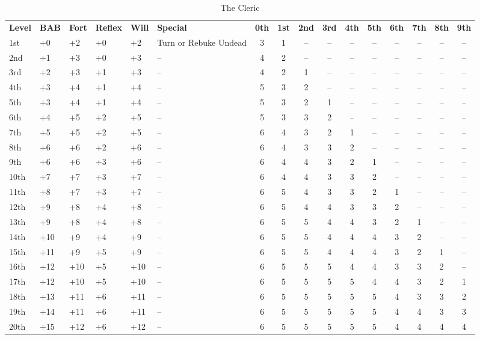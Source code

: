 \begin{table}[htb]
\caption{The Cleric}
\centering
\begin{tabular}{*{5}{l}p{1.5cm}*{10}{c}}
\textbf{Level} & \textbf{BAB} & \textbf{Fort} & \textbf{Reflex} & \textbf{Will} & \textbf{Special} & \textbf{0th} & \textbf{1st} & \textbf{2nd} & \textbf{3rd} & \textbf{4th} & \textbf{5th} & \textbf{6th} & \textbf{7th} & \textbf{8th} & \textbf{9th} \\
1st & +0 & +2 & +0 & +2 & \raggedright{}Turn or Rebuke Undead & 3 & 1 & -- & -- & -- & -- & -- & -- & -- & --\\
2nd & +1 & +3 & +0 & +3 & -- & 4 & 2 & -- & -- & -- & -- & -- & -- & -- & --\\
3rd & +2 & +3 & +1 & +3 & -- & 4 & 2 & 1 & -- & -- & -- & -- & -- & -- & --\\
4th & +3 & +4 & +1 & +4 & -- & 5 & 3 & 2 & -- & -- & -- & -- & -- & -- & --\\
5th & +3 & +4 & +1 & +4 & -- & 5 & 3 & 2 & 1 & -- & -- & -- & -- & -- & --\\
6th & +4 & +5 & +2 & +5 & -- & 5 & 3 & 3 & 2 & -- & -- & -- & -- & -- & --\\
7th & +5 & +5 & +2 & +5 & -- & 6 & 4 & 3 & 2 & 1 & -- & -- & -- & -- & --\\
8th & +6 & +6 & +2 & +6 & -- & 6 & 4 & 3 & 3 & 2 & -- & -- & -- & -- & --\\
9th & +6 & +6 & +3 & +6 & -- & 6 & 4 & 4 & 3 & 2 & 1 & -- & -- & -- & --\\
10th & +7 & +7 & +3 & +7 & -- & 6 & 4 & 4 & 3 & 3 & 2 & -- & -- & -- & --\\
11th & +8 & +7 & +3 & +7 & -- & 6 & 5 & 4 & 3 & 3 & 2 & 1 & -- & -- & --\\
12th & +9 & +8 & +4 & +8 & -- & 6 & 5 & 4 & 4 & 3 & 3 & 2 & -- & -- & --\\
13th & +9 & +8 & +4 & +8 & -- & 6 & 5 & 5 & 4 & 4 & 3 & 2 & 1 & -- & --\\
14th & +10 & +9 & +4 & +9 & -- & 6 & 5 & 5 & 4 & 4 & 4 & 3 & 2 & -- & --\\
15th & +11 & +9 & +5 & +9 & -- & 6 & 5 & 5 & 4 & 4 & 4 & 3 & 2 & 1 & --\\
16th & +12 & +10 & +5 & +10 & -- & 6 & 5 & 5 & 5 & 4 & 4 & 3 & 3 & 2 & --\\
17th & +12 & +10 & +5 & +10 & -- & 6 & 5 & 5 & 5 & 5 & 4 & 4 & 3 & 2 & 1\\
18th & +13 & +11 & +6 & +11 & -- & 6 & 5 & 5 & 5 & 5 & 5 & 4 & 3 & 3 & 2\\
19th & +14 & +11 & +6 & +11 & -- & 6 & 5 & 5 & 5 & 5 & 5 & 4 & 4 & 3 & 3\\
20th & +15 & +12 & +6 & +12 & -- & 6 & 5 & 5 & 5 & 5 & 5 & 4 & 4 & 4 & 4\\
\end{tabular}
\end{table}

